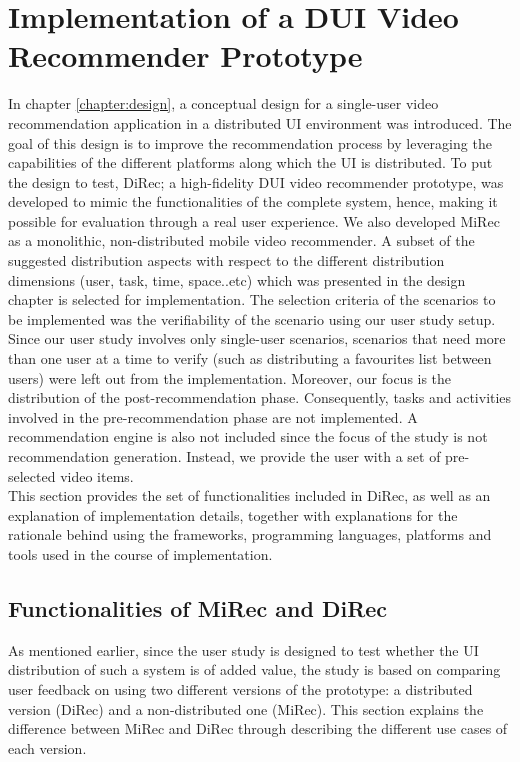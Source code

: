 \chapter{Implementation of a DUI Video Recommender
Prototype}\label{chapter:impl} 
In chapter \ref{chapter:design}, a conceptual design for a single-user video recommendation application in a distributed UI environment was introduced. 
The goal of this design is to improve the recommendation process by leveraging
the capabilities of the different platforms along which the UI is distributed. To put the design to test, DiRec; a high-fidelity DUI video recommender prototype, was developed to mimic the functionalities of the complete system,
hence, making it possible for evaluation through a real user experience. We also
developed MiRec as a monolithic, non-distributed mobile video recommender. A
subset of the suggested distribution aspects with respect to the different distribution dimensions (user, task, time, space..etc) which was presented in the design chapter is selected for implementation.
The selection criteria of the scenarios to be implemented was the verifiability
of the scenario using our user study setup.
Since our user study involves only single-user scenarios, scenarios that need
more than one user at a time to verify (such as distributing a favourites list between users) were left out from the implementation.
Moreover, our focus is the distribution of the post-recommendation phase.
Consequently, tasks and activities involved in the pre-recommendation phase are
not implemented.
A recommendation engine is also not included since the focus of the study is not
recommendation generation. Instead, we provide the user with a set of
pre-selected video items.\\ 
This section provides the set of functionalities included in DiRec, as well as
an explanation of implementation details, together with explanations for the
rationale behind using the frameworks, programming languages, platforms and
tools used in the course of implementation.
 
\section{Functionalities of MiRec and DiRec}
As mentioned earlier, since the user study is designed to test whether the UI
distribution of such a system is of added value, the study is based on comparing user feedback on using two different versions of the prototype: a distributed
version (DiRec) and a non-distributed one (MiRec). This section explains the
difference between MiRec and DiRec through describing the different use cases of each version.

